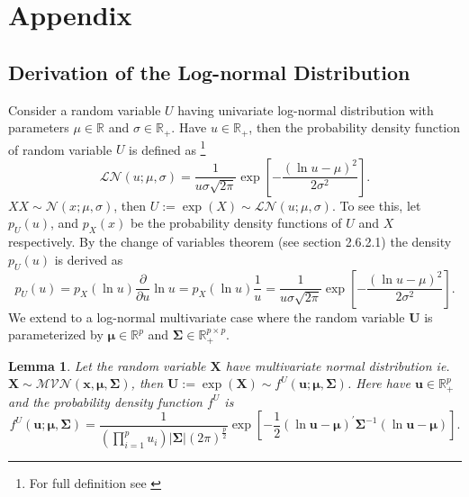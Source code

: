 \documentclass[11pt,letterpaper]{article}
\numberwithin{equation}{section}
\numberwithin{equation}{section}
\numberwithin{equation}{section}
\newtheorem{lemma}[theorem]{Lemma}
\begin{document}
\newpage
\section{Appendix}

\subsection{Derivation of the Log-normal Distribution }
Consider a random variable $U$ having univariate log-normal distribution with parameters $\mu \in \mathbb{R}$ and $\sigma \in \mathbb{R}_+ $. Have $u \in \mathbb{R}_+$, then the probability density function of random variable $U$ is defined as \footnote{For full definition see \cite{johnson1995continuous}}
$$\mathcal{LN}(u; \mu, \sigma) = \frac{1}{u\sigma\sqrt{2\pi}}\exp\left[-\frac{(\ln u - \mu)^2}{2\sigma^2}	\right].$$
$X$$ X \sim \mathcal{N}(x; \mu, \sigma) $, then $U := \exp{(X)}\sim \mathcal{LN}(u; \mu, \sigma) $.
To see this, let $p_U(u)$, and $ p_X(x) $ be the probability density functions of $U$ and $X$ respectively. By the change of variables theorem (see \cite{murphy2012machine} section 2.6.2.1) the density $p_U(u)$ is derived as
$$p_U(u) = p_X(\ln u )\frac{\partial}{\partial u} \ln u  =  p_X(\ln u ) \frac{1}{u} =  \frac{1}{u\sigma\sqrt{2\pi}}\exp\left[-\frac{(\ln u - \mu)^2}{2\sigma^2}	\right].$$\newline
 We extend to a log-normal multivariate case where the random variable $\bm{U} $ is parameterized by $ \bm{\mu} \in \mathbb{R}^p$ and $\bm{\Sigma} \in  \mathbb{R}_{+}^{p \times p} \label{changeVarUni} $.
\begin{lemma}
Let the random variable $\bm{X}$ have multivariate normal distribution ie. $\bm{X} \sim \mathcal{MVN}(\bm{x}, \bm{\mu},\bm{\Sigma}) $, then $\bm{U} := \exp(\bm{X} ) \sim  f^U(\bm{u}; \bm{\mu } , \bm{\Sigma} )$. Here
have $\bm{u} \in \mathbb{R}_{+}^p $ and the probability density function $f^U$ is
$$ f^U(\bm{u}; \bm{\mu } , \bm{\Sigma} )= \frac{1}{(\prod_{i=1}^{p}u_{i})| \bm{\Sigma} |(2 \pi)^{\frac{p}{2}}}   \exp\left[-\frac{1}{2}(\ln \bm{u} -\bm{\mu})^{'}  \bm{\Sigma}^{-1}(\ln \bm{u} -\bm{\mu})\right].  $$
\end{lemma}
\end{document}
